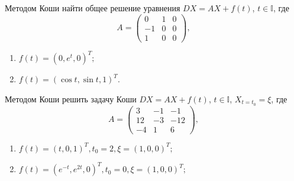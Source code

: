 \documentclass[a4paper, 12pt]{article}
\newcommand{\I}{\mathbb{I}}
\begin{document}
Методом Коши найти общее решение уравнения $DX = AX + f(t)$, $t \in \I$, где
$$A = \begin{pmatrix}
	0 & 1 & 0\\
	-1 & 0 & 0\\
	1 & 0 & 0
\end{pmatrix},$$
\begin{enumerate}
	\item $ f(t)=(0, e^t, 0)^T;$
	\item $f(t) = (\cos t, \sin t, 1)^T$.
\end{enumerate}
Методом Коши решить задачу Коши $DX = AX + f(t)$, $t \in \I$, $X_{t=t_0} = \xi$, где
$$A = \begin{pmatrix}
	3 & -1 & -1\\
	12 &-3 & -12\\
	-4 & 1 & 6
\end{pmatrix},$$
\begin{enumerate}
	\item $f(t) = (t, 0 ,1)^T, t_0 = 2, \xi = (1,0,0)^T;$
	\item $f(t) = (e^{-t}, e^{2t} ,0)^T, t_0 = 0, \xi = (1,0,0)^T;$
\end{enumerate}
\end{document}
